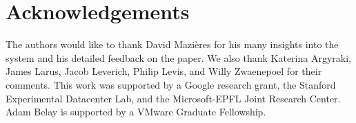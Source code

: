 
\section*{Acknowledgements}

The authors would like to thank David Mazi{\`e}res for his many
insights into the system and his detailed feedback on the
paper. We also thank Katerina Argyraki, James Larus, Jacob Leverich, Philip Levis, and Willy
Zwaenepoel for their comments. This work was supported by a Google
research grant, the Stanford Experimental Datacenter Lab, and the Microsoft-EPFL Joint Research Center. Adam Belay is supported
by a VMware Graduate Fellowship.  

\begin{comment}
\begin{itemize}
\item David Mazieres
\item Carlos Perez (EPFL) last minute IT setup
\item Detailed comments: Jacob Leverich, Jim Larus
\item High-level comments: Katerina Argyraki, Willy Z, Phil Levis
\item Sheperd
\item VMware Graduate Fellowship (for Adam)
\end{itemize}
\end{comment}


